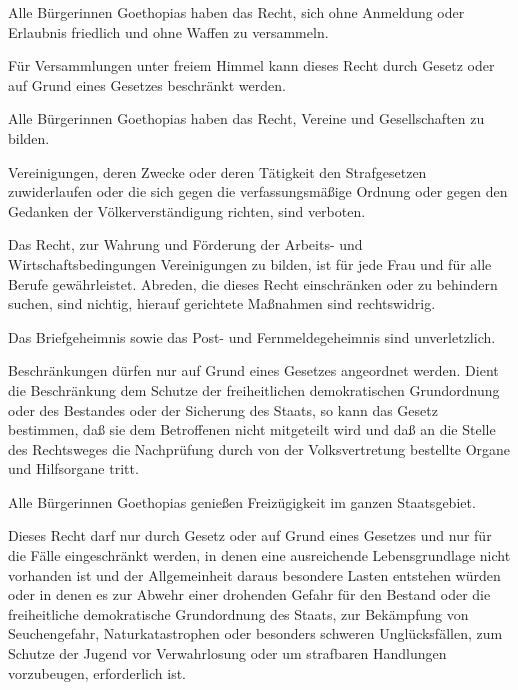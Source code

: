 \documentclass{sasbase}
\begin{document}
\begin{article}[Versammlungsfreiheit]
	\item Alle B\"{u}rgerinnen Goethopias haben das Recht, sich ohne Anmeldung oder Erlaubnis friedlich und ohne Waffen zu versammeln.
	\item Für Versammlungen unter freiem Himmel kann dieses Recht durch Gesetz oder auf Grund eines Gesetzes beschränkt werden.
\end{article}

\begin{article}[Vereinsfreiheit]
	\item Alle B\"{u}rgerinnen Goethopias haben das Recht, Vereine und Gesellschaften zu bilden.
	\item Vereinigungen, deren Zwecke oder deren Tätigkeit den Strafgesetzen zuwiderlaufen oder die sich gegen die verfassungsmäßige Ordnung oder gegen den Gedanken der Völkerverständigung richten, sind verboten.
	\item Das Recht, zur Wahrung und Förderung der Arbeits- und Wirtschaftsbedingungen Vereinigungen zu bilden, ist für jede Frau und für alle Berufe gewährleistet. Abreden, die dieses Recht einschränken oder zu behindern suchen, sind nichtig, hierauf gerichtete Maßnahmen sind rechtswidrig.
\end{article}

\begin{article}[Briefgeheimnis]
	\item Das Briefgeheimnis sowie das Post- und Fernmeldegeheimnis sind unverletzlich.
	\item Beschränkungen dürfen nur auf Grund eines Gesetzes angeordnet werden. Dient die Beschränkung dem Schutze der freiheitlichen demokratischen Grundordnung oder des Bestandes oder der Sicherung des Staats, so kann das Gesetz bestimmen, daß sie dem Betroffenen nicht mitgeteilt wird und daß an die Stelle des Rechtsweges die Nachprüfung durch von der Volksvertretung bestellte Organe und Hilfsorgane tritt.
\end{article}

\begin{article}
	\item Alle B\"{u}rgerinnen Goethopias genießen Freizügigkeit im ganzen Staatsgebiet.
	\item Dieses Recht darf nur durch Gesetz oder auf Grund eines Gesetzes und nur für die Fälle eingeschränkt werden, in denen eine ausreichende Lebensgrundlage nicht vorhanden ist und der Allgemeinheit daraus besondere Lasten entstehen würden oder in denen es zur Abwehr einer drohenden Gefahr für den Bestand oder die freiheitliche demokratische Grundordnung des Staats, zur Bekämpfung von Seuchengefahr, Naturkatastrophen oder besonders schweren Unglücksfällen, zum Schutze der Jugend vor Verwahrlosung oder um strafbaren Handlungen vorzubeugen, erforderlich ist.
\end{article}
\end{document}
